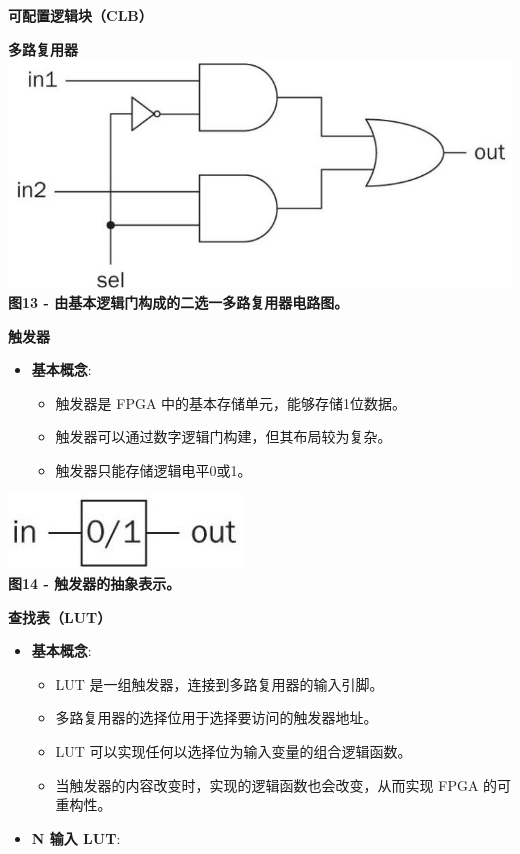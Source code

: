 \begin{frame}[allowframebreaks]{\textbf{可配置逻辑块（CLB）}}
\begin{block}{\textbf{多路复用器}}
\includegraphics[keepaspectratio]{img1/XC7A35TMUX.jpeg}\\
\textbf{图13 - 由基本逻辑门构成的二选一多路复用器电路图。}
\end{block}

\begin{block}{\textbf{触发器}}
\begin{itemize}
\tightlist
\item
    \textbf{基本概念}:

    \begin{itemize}
    \tightlist
    \item
    触发器是 FPGA 中的基本存储单元，能够存储1位数据。
    \item
    触发器可以通过数字逻辑门构建，但其布局较为复杂。
    \item
    触发器只能存储逻辑电平0或1。
    \end{itemize}
\end{itemize}

\includegraphics[keepaspectratio]{img1/XC7A35TFF.jpeg}\\
\textbf{图14 - 触发器的抽象表示。}
\end{block}

\begin{block}{\textbf{查找表（LUT）}}
\label{ux67e5ux627eux8868lut}
\begin{itemize}
\tightlist
\item
    \textbf{基本概念}:

    \begin{itemize}
    \tightlist
    \item
    LUT 是一组触发器，连接到多路复用器的输入引脚。
    \item
    多路复用器的选择位用于选择要访问的触发器地址。
    \item
    LUT 可以实现任何以选择位为输入变量的组合逻辑函数。
    \item
    当触发器的内容改变时，实现的逻辑函数也会改变，从而实现 FPGA
    的可重构性。
    \end{itemize}
\item
    \textbf{N 输入 LUT}:


\end{itemize}
\end{block}
\end{frame}
